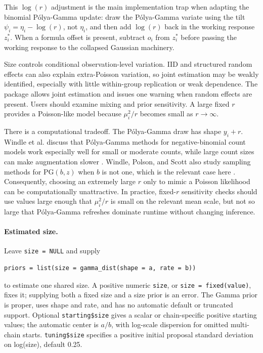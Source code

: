 \documentclass[11pt]{article}
\begin{document}
This $\log(r)$ adjustment is the main implementation trap when adapting the binomial P{\'o}lya-Gamma update: draw the P{\'o}lya-Gamma variate using the tilt $\psi_i=\eta_i-\log(r)$, not $\eta_i$, and then add $\log(r)$ back in the working response $z_i^\ast$. When a formula offset is present, subtract $o_i$ from $z_i^\ast$ before passing the working response to the collapsed Gaussian machinery.

Size controls conditional observation-level variation. IID and structured random effects can also explain extra-Poisson variation, so joint estimation may be weakly identified, especially with little within-group replication or weak dependence. The package allows joint estimation and issues one warning when random effects are present. Users should examine mixing and prior sensitivity. A large fixed $r$ provides a Poisson-like model because $\mu_i^2/r$ becomes small as $r\rightarrow\infty$.

There is a computational tradeoff. The P{\'o}lya-Gamma draw has shape $y_i+r$. Windle et al. discuss that P{\'o}lya-Gamma methods for negative-binomial count models work especially well for small or moderate counts, while large count sizes can make augmentation slower \citep{WindleDynamic2013}. Windle, Polson, and Scott also study sampling methods for $\mathrm{PG}(b,z)$ when $b$ is not one, which is the relevant case here \citep{WindleSampling2014}. Consequently, choosing an extremely large $r$ only to mimic a Poisson likelihood can be computationally unattractive. In practice, fixed-$r$ sensitivity checks should use values large enough that $\mu_i^2/r$ is small on the relevant mean scale, but not so large that P{\'o}lya-Gamma refreshes dominate runtime without changing inference.

\paragraph{Estimated size.}
Leave \texttt{size = NULL} and supply
\begin{verbatim}
priors = list(size = gamma_dist(shape = a, rate = b))
\end{verbatim}
to estimate one shared size. A positive numeric \texttt{size}, or \texttt{size = fixed(value)}, fixes it; supplying both a fixed size and a size prior is an error. The Gamma prior is proper, uses shape and rate, and has no automatic default or truncated support. Optional \texttt{starting\$size} gives a scalar or chain-specific positive starting values; the automatic center is $a/b$, with log-scale dispersion for omitted multi-chain starts. \texttt{tuning\$size} specifies a positive initial proposal standard deviation on log(size), default 0.25.
\end{document}
